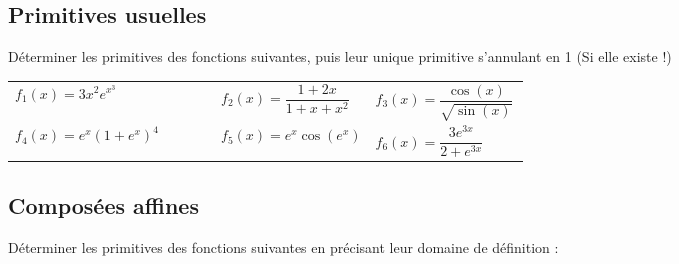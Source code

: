 \documentclass[oneside,12pt]{book}          %
\begin{document}
\subsection{Primitives usuelles}
Déterminer les primitives des fonctions suivantes, puis leur unique primitive s'annulant en 1 (Si elle existe !)\\
\renewcommand{\arraystretch}{2}
\begin{tabular}{ p{0.3\textwidth} p{0.3\textwidth} p{0.3\textwidth} }
	$f_{1}(x)=3x^{2}-2x+4$ & $f_{2}(x)=x^{4}+\frac{x^{3}}{5}-5x$ & $f_{3}(x)=\frac{1}{2}+\frac{2x}{3}+\frac{3x^{2}}{4} $\\
	$f_{4}(x)=\frac{1}{x}+\frac{1}{x^{2}}$ & $f_{5}(x)=\frac{1}{\sqrt{x}}+\frac{1}{x^{3}}$ & $f_{6}(x)=\dfrac{1+x+x^{2}}{x}$ \\
	$f_{7}(x)=3e^{x}$ & $f_{8}(x)=\sin{(x)}-\cos{(x)}$ & $f_9(x)=\frac{1}{x}\left(1+\frac{1}{x^2}\right)$\\
	$f_{10}(x)=\dfrac{3}{x^7}-\dfrac{x^3}{7}$ & $f_{11}(x)=\dfrac{14}{3\sqrt{x}}+\dfrac{14\sqrt{x}}{3}$ & $f_{12}(x)=\dfrac{x^3+3x+9}{2x^2}$ \\
	$f_{13}(x)=x+\sqrt{x}+1$ & $f_{14}(x)=\frac{x}{\sqrt{x}}+\frac{\sqrt{x}}{x}$ & $f_{15}(x)=\sqrt{x}+x\sqrt{x}+x^2\sqrt{x}$ \\
	$f_{16}(x)=\sqrt{x}\left(3\sqrt{x}+\frac{2}{x}+x\sqrt{x}\right)$ & $f_{17}(x)=\dfrac{\cos^2(x)}{1-\sin(x)}$ & $f_{18}(x)=\dfrac{3}{2e^{-x}}+x+\dfrac{2x-1}{x}$
\end{tabular}



\subsection{Formes simples}
Déterminer les primitives des fonctions suivantes :

\renewcommand{\arraystretch}{2}
\begin{tabular}{p{0.3\linewidth} p{0.3\linewidth} p{0.3\linewidth}}
$f_1(x) = 3x^2 e^{x^3}$ & $f_2(x) = \dfrac{1 + 2x}{1 + x + x^2}$ & $f_3(x) = \dfrac{\cos(x)}{\sqrt{\sin(x)}}$ \\
$f_4(x) = e^x (1 + e^x)^4$ & $f_5(x) = e^x \cos(e^x)$ & $f_6(x) = \dfrac{3e^{3x}}{2 + e^{3x}}$
\end{tabular}



\subsection{Composées affines}
  Déterminer les primitives des fonctions suivantes en précisant leur domaine de définition :
\end{document}
